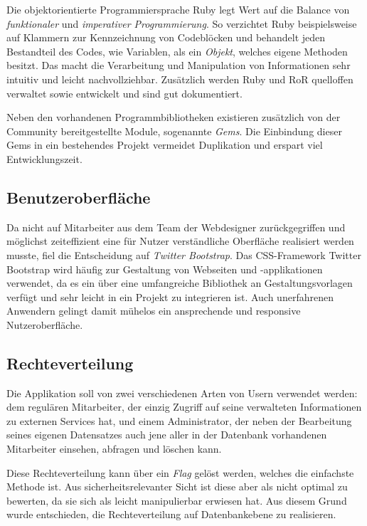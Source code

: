 Die objektorientierte Programmiersprache Ruby legt Wert auf die Balance von \textit{funktionaler} und
\textit{imperativer Programmierung}. So verzichtet Ruby beispielsweise auf Klammern zur Kennzeichnung
von Codeblöcken und behandelt jeden Bestandteil des Codes, wie Variablen, als ein \textit{Objekt},
welches eigene Methoden besitzt. Das macht die Verarbeitung und Manipulation von Informationen sehr
intuitiv und leicht nachvollziehbar. Zusätzlich werden Ruby und \acs{RoR}
quelloffen verwaltet sowie entwickelt und sind gut dokumentiert.

Neben den vorhandenen Programmbibliotheken existieren zusätzlich von der Community bereitgestellte Module,
sogenannte \textit{Gems}. Die Einbindung dieser Gems in ein bestehendes Projekt vermeidet
Duplikation und erspart viel Entwicklungszeit.

\subsection{Benutzeroberfläche}
\label{sec:Benutzeroberfläche}
Da nicht auf Mitarbeiter aus dem Team der Webdesigner zurückgegriffen und möglichst zeiteffizient
eine für Nutzer verständliche Oberfläche realisiert werden musste, fiel die Entscheidung auf
\textit{Twitter Bootstrap}.
Das CSS-Framework Twitter Bootstrap wird häufig zur Gestaltung von Webseiten und
-applikationen verwendet, da es ein über eine umfangreiche Bibliothek an Gestaltungsvorlagen
verfügt und sehr leicht in ein Projekt zu integrieren ist. Auch unerfahrenen Anwendern gelingt damit
mühelos ein ansprechende und responsive Nutzeroberfläche.

\subsection{Rechteverteilung}
\label{sec:Rechteverteilung}
Die Applikation soll von zwei verschiedenen Arten von Usern verwendet werden: dem regulären
Mitarbeiter, der einzig Zugriff auf seine verwalteten Informationen zu externen Services hat, und
einem Administrator, der neben der Bearbeitung seines eigenen Datensatzes auch jene aller in der
Datenbank vorhandenen Mitarbeiter einsehen, abfragen und löschen kann.

Diese Rechteverteilung kann über ein \textit{Flag} gelöst werden, welches die einfachste Methode ist.
Aus sicherheitsrelevanter Sicht ist diese aber als nicht optimal zu bewerten, da sie sich als leicht
manipulierbar erwiesen hat. Aus diesem Grund wurde entschieden, die Rechteverteilung auf
Datenbankebene zu realisieren.

